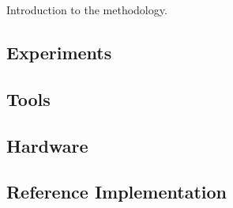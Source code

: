 Introduction to the methodology.

\subsection{Experiments}

\subsection{Tools}

\subsection{Hardware}


\subsection{Reference Implementation}
